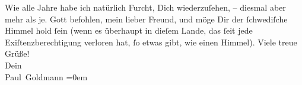 \begin{ledgroupsized}[t]{13cm}
           \pstart
           Wie alle Jahre habe ich natürlich Furcht, Dich {\pb}wiederzuſehen, – diesmal aber mehr als je.\pend
           \pstart
           Gott befohlen, mein lieber Freund, und möge Dir der ſchwediſche Himmel hold ſein (wenn es
               überhaupt in dieſem Lande,
               das ſeit \label{K_L02780-3v}\label{K_L02780-3h} jede Exiſtenzberechtigung verloren hat, ſo etwas gibt, wie einen Himmel).\pend
           \pstart
           Viele treue Grüße! {\\[\baselineskip]}Dein {\\[\baselineskip]}\spacefill\mbox{Paul Goldmann}\pend
           \leftskip=0em{}
         
         \endnumbering{}\end{ledgroupsized}  \newcommand{\dateiname}{L02780}\newcommand{\titel}{Paul Goldmann an Arthur Schnitzler, 4. 7. [1896]}\newcommand{\editorInnen}{Martin Anton Müller und Laura Untner}
      